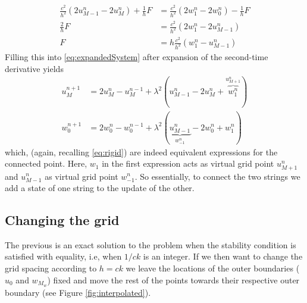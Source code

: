 \documentclass[dvipsnames]{article}
\begin{document}
\begin{align}
     \frac{c^2}{h^2}(2u_{M-1}^n-2u_M^n) + \frac{1}{h} F&= 
     \frac{c^2}{h^2}(2w_1^n-2w_0^n) - \frac{1}{h} F\\
    \frac{2}{h}F &= \frac{c^2}{h^2}(2w_1^n - 2u_{M-1}^n)\nonumber\\
    F &= h \frac{c^2}{h^2}(w_1^n - u_{M-1}^n)
\end{align}
Filling this into \eqref{eq:expandedSystem} after expansion of the second-time derivative yields
\begin{subequations}\label{eq:resultOneConnectedPoint}
\begin{align}
    u^{n+1}_M &= 2u_M^n - u_M^{n-1} + \lambda^2(u_{M-1}^n-2u_M^n+\overbrace{w_1^n}^{u_{M+1}^n})\label{eq:resultOneConnectedPoint1}\\
    w^{n+1}_0 &= 2w_0^n - w_0^{n-1} + \lambda^2(\underbrace{u_{M-1}^n}_{w_{-1}^n}-2w_0^n+w_1^n)\label{eq:resultOneConnectedPoint2}
\end{align}
\end{subequations}
which, (again, recalling \eqref{eq:rigid}) are indeed equivalent expressions for the connected point. Here, $w_1$ in the first expression acts as virtual grid point $u_{M+1}^n$ and $u_{M-1}^n$ as virtual grid point $w_{-1}^n$. So essentially, to connect the two strings we add a state of one string to the update of the other.

\subsection{Changing the grid}
The previous is an exact solution to the problem when the stability condition is satisfied with equality, i.e, when $1/ck$ is an integer. If we then want to change the grid spacing according to $h=ck$ we leave the locations of the outer boundaries ($u_0$ and $w_{M_w}$) fixed and move the rest of the points towards their respective outer boundary (see Figure \ref{fig:interpolated}). 
\end{document}
